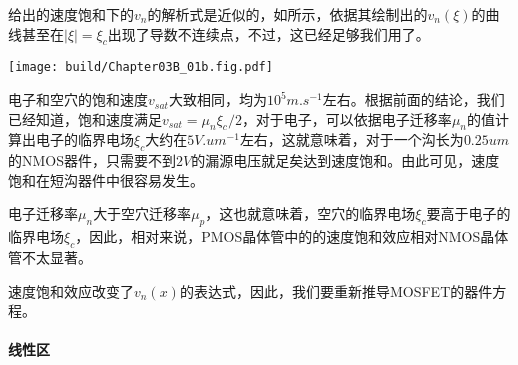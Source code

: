 给出的速度饱和下的$v_n$的解析式是近似的，如所示，依据其绘制出的$v_n(\xi)$的曲线甚至在$|\xi|=\xi_c$出现了导数不连续点，不过，这已经足够我们用了。
\begin{Figure}[速度饱和效应]
    \texttt{[image: build/Chapter03B\_01b.fig.pdf]}
\end{Figure}

电子和空穴的饱和速度$v_{sat}$大致相同，均为$10^5\si{m.s^{-1}}$左右。根据前面的结论，我们已经知道，饱和速度满足$v_{sat}=\mu_n\xi_c/2$，对于电子，可以依据电子迁移率$\mu_n$的值计算出电子的临界电场$\xi_c$大约在$5\si{V.um^{-1}}$左右，这就意味着，对于一个沟长为$0.25\si{um}$的NMOS器件，只需要不到$2\si{V}$的漏源电压就足矣达到速度饱和。由此可见，速度饱和在短沟器件中很容易发生。

电子迁移率$\mu_n$大于空穴迁移率$\mu_p$，这也就意味着，空穴的临界电场$\xi_c$要高于电子的临界电场$\xi_c$，因此，相对来说，PMOS晶体管中的的速度饱和效应相对NMOS晶体管不太显著。


速度饱和效应改变了$v_n(x)$的表达式，因此，我们要重新推导MOSFET的器件方程。

\paragraph{线性区}

